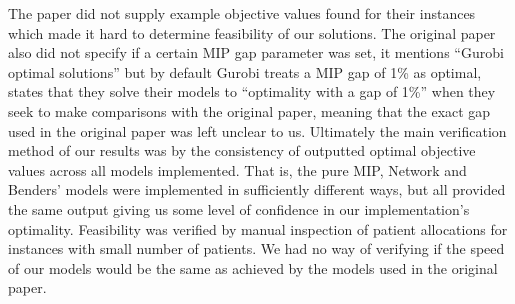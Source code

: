 The paper did not supply example objective values found for their instances which made it hard to determine feasibility of our solutions. The original paper also did not specify if a certain MIP gap parameter was set, it mentions ``Gurobi optimal solutions'' but by default Gurobi treats a MIP gap of 1\% as optimal,~\cite{guo} states that they solve their models to ``optimality with a gap of 1\%'' when they seek to make comparisons with the original paper, meaning that the exact gap used in the original paper was left unclear to us. Ultimately the main verification method of our results was by the consistency of outputted optimal objective values across all models implemented. That is, the pure MIP, Network and Benders' models were implemented in sufficiently different ways, but all provided the same output giving us some level of confidence in our implementation's optimality. Feasibility was verified by manual inspection of patient allocations for instances with small number of patients. We had no way of verifying if the speed of our models would be the same as achieved by the models used in the original paper.